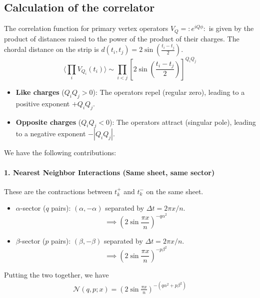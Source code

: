 \documentclass[11pt]{article}
\begin{document}
  \subsection*{Calculation of the correlator}

  The correlation function for primary vertex operators $V_{Q}= :e^{i Q \phi}:$
  is given by the product of distances raised to the power of the product of
  their charges. The chordal distance on the strip is $d(t_{i}, t_{j}) = 2 \sin(\frac{t_{i}-
  t_{j}}{2})$.
  \begin{equation}
    \langle \prod_{i}V_{Q_i}(t_{i}) \rangle \sim \prod_{i<j}\left[ 2 \sin\left( \frac{t_{i}-
    t_{j}}{2}\right) \right]^{Q_i Q_j}
  \end{equation}
  \begin{itemize}
    \item \textbf{Like charges} ($Q_{i}Q_{j}> 0$): The operators repel (regular
      zero), leading to a positive exponent $+Q_{i}Q_{j}$.

    \item \textbf{Opposite charges} ($Q_{i}Q_{j}< 0$): The operators attract (singular
      pole), leading to a negative exponent $-|Q_{i}Q_{j}|$.
  \end{itemize}

  We have the following contributions:
  \paragraph{1. Nearest Neighbor Interactions (Same sheet, same sector)}
  These are the contractions between $t_{k}^{+}$ and $t_{k}^{-}$ on the same sheet.
  \begin{itemize}
    \item $\alpha$-sector ($q$ pairs): $(\alpha, -\alpha)$ separated by
      $\Delta t = 2\pi x/n$.
      \[
        \implies \left( 2 \sin \frac{\pi x}{n}\right)^{-q \alpha^2}
      \]

    \item $\beta$-sector ($p$ pairs): $(\beta, -\beta)$ separated by
      $\Delta t = 2\pi x/n$.
      \[
        \implies \left( 2 \sin \frac{\pi x}{n}\right)^{-p \beta^2}
      \]
  \end{itemize}
  Putting the two together, we have
  \begin{eqnarray}
    \label{Nfunc} \mathcal{N}(q,p;x)=\left( 2 \sin \frac{\pi x}{n} \right)^{-(q\alpha^2+p\beta^2)}
  \end{eqnarray}
\end{document}
